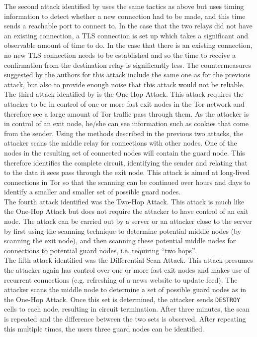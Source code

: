 \documentclass[9pt,technote]{IEEEtran}
\begin{document}
The second attack identified by \citeauthor{biryukov2012torscan} uses the same tactics as above but uses timing information to detect whether a new connection had to be made, and this time sends a reachable port to connect to. In the case that the two relays did not have an existing connection, a TLS connection is set up which takes a significant and observable amount of time to do. In the case that there is an existing connection, no new TLS connection needs to be established and so the time to receive a confirmation from the destination relay is significantly less. The countermeasures suggested by the authors for this attack include the same one as for the previous attack, but also to provide enough noise that this attack would not be reliable.\\

The third attack identified by \citeauthor{biryukov2012torscan} is the One-Hop Attack. This attack requires the attacker to be in control of one or more fast exit nodes in the Tor network and therefore see a large amount of Tor traffic pass through them. As the attacker is in control of an exit node, he/she can see information such as cookies that come from the sender. Using the methods described in the previous two attacks, the attacker scans the middle relay for connections with other nodes. One of the nodes in the resulting set of connected nodes will contain the guard node. This therefore identifies the complete circuit, identifying the sender and relating that to the data it sees pass through the exit node. This attack is aimed at long-lived connections in Tor so that the scanning can be continued over hours and days to identify a smaller and smaller set of possible guard nodes.\\

The fourth attack identified was the Two-Hop Attack. This attack is much like the One-Hop Attack but does not require the attacker to have control of an exit node. The attack can be carried out by a server or an attacker close to the server by first using the scanning technique to determine potential middle nodes (by scanning the exit node), and then scanning these potential middle nodes for connections to potential guard nodes, i.e. requiring ``two hops''.\\

The fifth attack identified was the Differential Scan Attack. This attack presumes the attacker again has control over one or more fast exit nodes and makes use of recurrent connections (e.g. refreshing of a news website to update feed). The attacker scans the middle node to determine a set of possible guard nodes as in the One-Hop Attack. Once this set is determined, the attacker sends \texttt{DESTROY} cells to each node, resulting in circuit termination. After three minutes, the scan is repeated and the difference between the two sets is observed. After repeating this multiple times, the users three guard nodes can be identified.
\end{document}
